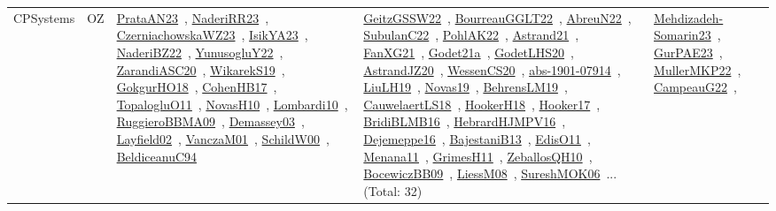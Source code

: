 {\begin{longtable}{lp{3cm}>{\raggedright\arraybackslash}p{6cm}>{\raggedright\arraybackslash}p{6cm}>{\raggedright\arraybackslash}p{8cm}}
CPSystems & OZ & \href{works/PrataAN23.pdf}{PrataAN23}~\cite{PrataAN23}, \href{works/NaderiRR23.pdf}{NaderiRR23}~\cite{NaderiRR23}, \href{works/CzerniachowskaWZ23.pdf}{CzerniachowskaWZ23}~\cite{CzerniachowskaWZ23}, \href{works/IsikYA23.pdf}{IsikYA23}~\cite{IsikYA23}, \href{works/NaderiBZ22.pdf}{NaderiBZ22}~\cite{NaderiBZ22}, \href{works/YunusogluY22.pdf}{YunusogluY22}~\cite{YunusogluY22}, \href{works/ZarandiASC20.pdf}{ZarandiASC20}~\cite{ZarandiASC20}, \href{works/WikarekS19.pdf}{WikarekS19}~\cite{WikarekS19}, \href{works/GokgurHO18.pdf}{GokgurHO18}~\cite{GokgurHO18}, \href{works/CohenHB17.pdf}{CohenHB17}~\cite{CohenHB17}, \href{works/TopalogluO11.pdf}{TopalogluO11}~\cite{TopalogluO11}, \href{works/NovasH10.pdf}{NovasH10}~\cite{NovasH10}, \href{works/Lombardi10.pdf}{Lombardi10}~\cite{Lombardi10}, \href{works/RuggieroBBMA09.pdf}{RuggieroBBMA09}~\cite{RuggieroBBMA09}, \href{works/Demassey03.pdf}{Demassey03}~\cite{Demassey03}, \href{works/Layfield02.pdf}{Layfield02}~\cite{Layfield02}, \href{works/VanczaM01.pdf}{VanczaM01}~\cite{VanczaM01}, \href{works/SchildW00.pdf}{SchildW00}~\cite{SchildW00}, \href{works/BeldiceanuC94.pdf}{BeldiceanuC94}~\cite{BeldiceanuC94} & \href{works/GeitzGSSW22.pdf}{GeitzGSSW22}~\cite{GeitzGSSW22}, \href{works/BourreauGGLT22.pdf}{BourreauGGLT22}~\cite{BourreauGGLT22}, \href{works/AbreuN22.pdf}{AbreuN22}~\cite{AbreuN22}, \href{works/SubulanC22.pdf}{SubulanC22}~\cite{SubulanC22}, \href{works/PohlAK22.pdf}{PohlAK22}~\cite{PohlAK22}, \href{works/Astrand21.pdf}{Astrand21}~\cite{Astrand21}, \href{works/FanXG21.pdf}{FanXG21}~\cite{FanXG21}, \href{works/Godet21a.pdf}{Godet21a}~\cite{Godet21a}, \href{works/GodetLHS20.pdf}{GodetLHS20}~\cite{GodetLHS20}, \href{works/AstrandJZ20.pdf}{AstrandJZ20}~\cite{AstrandJZ20}, \href{works/WessenCS20.pdf}{WessenCS20}~\cite{WessenCS20}, \href{works/abs-1901-07914.pdf}{abs-1901-07914}~\cite{abs-1901-07914}, \href{works/LiuLH19.pdf}{LiuLH19}~\cite{LiuLH19}, \href{works/Novas19.pdf}{Novas19}~\cite{Novas19}, \href{works/BehrensLM19.pdf}{BehrensLM19}~\cite{BehrensLM19}, \href{works/CauwelaertLS18.pdf}{CauwelaertLS18}~\cite{CauwelaertLS18}, \href{works/HookerH18.pdf}{HookerH18}~\cite{HookerH18}, \href{works/Hooker17.pdf}{Hooker17}~\cite{Hooker17}, \href{works/BridiBLMB16.pdf}{BridiBLMB16}~\cite{BridiBLMB16}, \href{works/HebrardHJMPV16.pdf}{HebrardHJMPV16}~\cite{HebrardHJMPV16}, \href{works/Dejemeppe16.pdf}{Dejemeppe16}~\cite{Dejemeppe16}, \href{works/BajestaniB13.pdf}{BajestaniB13}~\cite{BajestaniB13}, \href{works/EdisO11.pdf}{EdisO11}~\cite{EdisO11}, \href{works/Menana11.pdf}{Menana11}~\cite{Menana11}, \href{works/GrimesH11.pdf}{GrimesH11}~\cite{GrimesH11}, \href{works/ZeballosQH10.pdf}{ZeballosQH10}~\cite{ZeballosQH10}, \href{works/BocewiczBB09.pdf}{BocewiczBB09}~\cite{BocewiczBB09}, \href{works/LiessM08.pdf}{LiessM08}~\cite{LiessM08}, \href{works/SureshMOK06.pdf}{SureshMOK06}~\cite{SureshMOK06}... (Total: 32) & \href{works/Mehdizadeh-Somarin23.pdf}{Mehdizadeh-Somarin23}~\cite{Mehdizadeh-Somarin23}, \href{works/GurPAE23.pdf}{GurPAE23}~\cite{GurPAE23}, \href{works/MullerMKP22.pdf}{MullerMKP22}~\cite{MullerMKP22}, \href{works/CampeauG22.pdf}{CampeauG22}~\cite{CampeauG22}, 
\end{longtable}}

